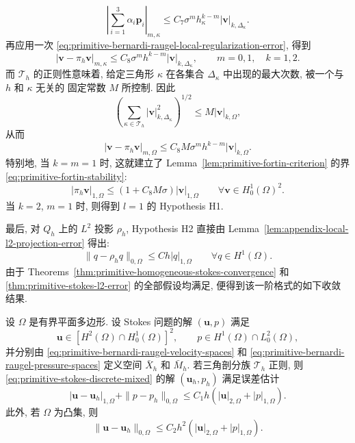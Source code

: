 \begin{Proof}
\[
\left|\sum_{i=1}^3\alpha_i\mathbf p_i\right|_{m,\kappa}
\leq C_7\sigma^m h_\kappa^{k-m}|\mathbf v|_{k,\Delta_\kappa}.
\]
再应用一次 \eqref{eq:primitive-bernardi-raugel-local-regularization-error},
得到
\[
|\mathbf v-\pi_h\mathbf v|_{m,\kappa}
\leq C_8\sigma^m h^{k-m}|\mathbf v|_{k,\Delta_\kappa},
\qquad m=0,1,\quad k=1,2.
\]
而 $\mathcal{T}_h$ 的正则性意味着, 给定三角形 $\kappa$ 在各集合
$\Delta_\kappa$ 中出现的最大次数, 被一个与 $h$ 和 $\kappa$ 无关的
固定常数 $M$ 所控制. 因此
\[
\left(\sum_{\kappa\in\mathcal{T}_h}
|\mathbf v|_{k,\Delta_\kappa}^2\right)^{1/2}
\leq M|\mathbf v|_{k,\Omega},
\]
从而
\[
|\mathbf v-\pi_h\mathbf v|_{m,\Omega}
\leq C_8M\sigma^m h^{k-m}|\mathbf v|_{k,\Omega}.
\]
特别地, 当 $k=m=1$ 时, 这就建立了
Lemma~\ref{lem:primitive-fortin-criterion} 的界
\eqref{eq:primitive-fortin-stability}:
\[
|\pi_h\mathbf v|_{1,\Omega}
\leq(1+C_8M\sigma)|\mathbf v|_{1,\Omega}
\qquad\forall\mathbf v\in H_0^1(\Omega)^2.
\]
当 $k=2$, $m=1$ 时, 则得到 $l=1$ 的 Hypothesis H1.
\end{Proof}

最后, 对 $Q_h$ 上的 $L^2$ 投影 $\rho_h$, Hypothesis H2 直接由
Lemma~\ref{lem:appendix-local-l2-projection-error} 得出:
\begin{equation}\label{eq:primitive-bernardi-raugel-pressure-projection}
\|q-\rho_hq\|_{0,\Omega}
\leq Ch|q|_{1,\Omega}
\qquad\forall q\in H^1(\Omega).
\end{equation}
由于 Theorems~\ref{thm:primitive-homogeneous-stokes-convergence} 和
\ref{thm:primitive-stokes-l2-error} 的全部假设均满足,
便得到该一阶格式的如下收敛结果.

\setcounter{statement}{0}
\begin{Theorem}\label{thm:primitive-bernardi-raugel-convergence}
设 $\Omega$ 是有界平面多边形. 设 Stokes 问题的解
$(\mathbf u,p)$ 满足
\[
\mathbf u\in[H^2(\Omega)\cap H_0^1(\Omega)]^2,
\qquad
p\in H^1(\Omega)\cap L_0^2(\Omega),
\]
并分别由 \eqref{eq:primitive-bernardi-raugel-velocity-spaces} 和
\eqref{eq:primitive-bernardi-raugel-pressure-spaces} 定义空间
$\bar X_h$ 和 $\bar M_h$. 若三角剖分族 $\mathcal{T}_h$ 正则,
则 \eqref{eq:primitive-stokes-discrete-mixed} 的解
$(\mathbf u_h,p_h)$ 满足误差估计
\begin{equation}\label{eq:primitive-bernardi-raugel-h1-error}
|\mathbf u-\mathbf u_h|_{1,\Omega}
+\|p-p_h\|_{0,\Omega}
\leq C_1h(|\mathbf u|_{2,\Omega}+|p|_{1,\Omega}).
\end{equation}
此外, 若 $\Omega$ 为凸集, 则
\begin{equation}\label{eq:primitive-bernardi-raugel-l2-error}
\|\mathbf u-\mathbf u_h\|_{0,\Omega}
\leq C_2h^2(|\mathbf u|_{2,\Omega}+|p|_{1,\Omega}).
\end{equation}
\end{Theorem}

